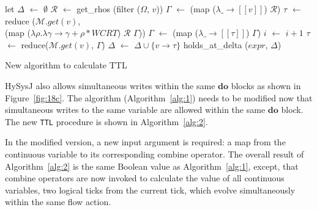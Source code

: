 \documentclass[10pt,journal,cspaper,compsoc]{IEEEtran}
\begin{document}
\begin{algorithm}[t!]
  \begin{minipage}{1.0\linewidth}
    \SetAlgoLined
    let $\Delta$ $\leftarrow$ $\emptyset$\;
     {
      $\mathcal{R}$ $\leftarrow$ get\_rhos (filter ($\Omega$, $v$))\;
       { \label{alg:2:l1}
        $\Gamma$ $\leftarrow$ (map ($\lambda\_ \rightarrow [\![v]\!]$)
        $\mathcal{R}$) \label{alg:2:l2}\;
         {
          $\tau$ $\leftarrow$ reduce ($\mathcal{M}.get(v)$,\\
          (map ($\lambda\rho.\lambda\gamma \rightarrow
          \gamma + \rho * WCRT$) $\mathcal{R}$ $\Gamma$)) \;
          $\Gamma$ $\leftarrow$ (map ($\lambda\_ \rightarrow [\![\tau]\!]$) $\Gamma$)\;
          $i$ $\leftarrow$ $i+1$\;
        }
        $\tau$ $\leftarrow$ reduce($\mathcal{M}.get(v)$, $\Gamma$)\;
        $\Delta$ $\leftarrow$ $\Delta \cup \{v \rightarrow
        \tau\}$ \label{alg:2:l3}\;
      }
    }
    \Return holds\_at\_delta ($expr$, $\Delta$)\;
    \caption{New algorithm to calculate TTL}
    \label{alg:2}
  \end{minipage}
\end{algorithm}

HySysJ also allows simultaneous writes within the same $\mathbf{do}$
blocks as shown in Figure~\ref{fig:18c}. The algorithm
(Algorithm~\ref{alg:1}) needs to be modified now that simultaneous
writes to the same variable are allowed within the same $\mathbf{do}$
block. The new \texttt{TTL} procedure is shown in Algorithm~\ref{alg:2}.

In the modified version, a new input argument is required: a map from
the continuous variable to its corresponding combine operator. The
overall result of Algorithm~\ref{alg:2} is the same Boolean value as
Algorithm~\ref{alg:1}, except, that combine operators are now invoked to
calculate the value of all continuous variables, two logical ticks from
the current tick, which evolve simultaneously within the same flow
action.
\end{document}
